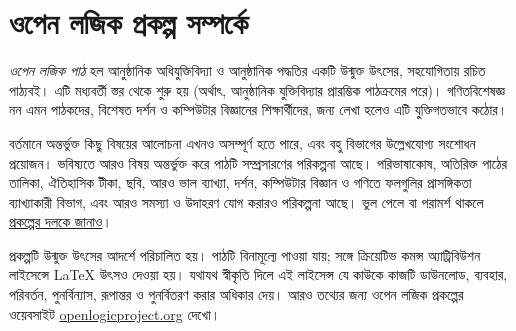 \chapter*{ওপেন লজিক প্রকল্প সম্পর্কে}


\textit{ওপেন লজিক পাঠ} হল আনুষ্ঠানিক অধিযুক্তিবিদ্যা ও আনুষ্ঠানিক
পদ্ধতির একটি উন্মুক্ত উৎসের, সহযোগিতায় রচিত পাঠ্যবই। এটি মধ্যবর্তী
স্তর থেকে শুরু হয় (অর্থাৎ, আনুষ্ঠানিক যুক্তিবিদ্যার প্রারম্ভিক
পাঠক্রমের পরে)। গণিতবিশেষজ্ঞ নন এমন পাঠকদের, বিশেষত দর্শন ও
কম্পিউটার বিজ্ঞানের শিক্ষার্থীদের, জন্য লেখা হলেও এটি যুক্তিগতভাবে
কঠোর।

বর্তমানে অন্তর্ভুক্ত কিছু বিষয়ের আলোচনা এখনও অসম্পূর্ণ হতে পারে,
এবং বহু বিভাগের উল্লেখযোগ্য সংশোধন প্রয়োজন। ভবিষ্যতে আরও বিষয়
অন্তর্ভুক্ত করে পাঠটি সম্প্রসারণের পরিকল্পনা আছে। পরিভাষাকোষ,
অতিরিক্ত পাঠের তালিকা, ঐতিহাসিক টীকা, ছবি, আরও ভাল ব্যাখ্যা,
দর্শন, কম্পিউটার বিজ্ঞান ও গণিতে ফলগুলির প্রাসঙ্গিকতা ব্যাখ্যাকারী
বিভাগ, এবং আরও সমস্যা ও উদাহরণ যোগ করারও পরিকল্পনা আছে।
ভুল পেলে বা পরামর্শ থাকলে
\href{https://github.com/OpenLogicProject/OpenLogic/wiki/Contributing}{প্রকল্পের দলকে জানাও}।

প্রকল্পটি উন্মুক্ত উৎসের আদর্শে পরিচালিত হয়। পাঠটি বিনামূল্যে
পাওয়া যায়; সঙ্গে ক্রিয়েটিভ কমন্স অ্যাট্রিবিউশন লাইসেন্সে
LaTeX উৎসও দেওয়া হয়। যথাযথ স্বীকৃতি দিলে এই লাইসেন্স যে কাউকে
কাজটি ডাউনলোড, ব্যবহার, পরিবর্তন, পুনর্বিন্যাস, রূপান্তর ও পুনর্বিতরণ
করার অধিকার দেয়। আরও তথ্যের জন্য ওপেন লজিক প্রকল্পের ওয়েবসাইট
\href{http://openlogicproject.org/}{openlogicproject.org} দেখো।
